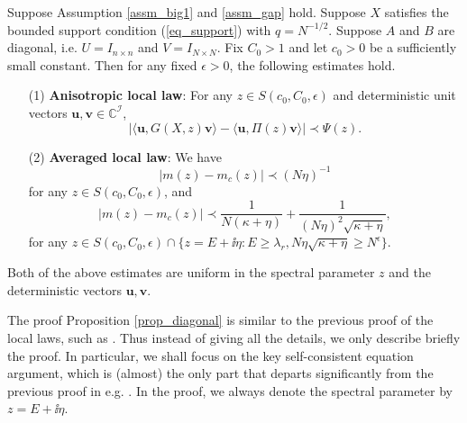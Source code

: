 \begin{proposition}\label{prop_diagonal}
Suppose Assumption \ref{assm_big1} and \eqref{assm_gap} hold. Suppose $X$ satisfies the bounded support condition (\ref{eq_support}) with $q= N^{-1/2}$. Suppose $A$ and $B$ are diagonal, i.e. $U=I_{n\times n}$ and $V=I_{N\times N}$. Fix $C_0>1$ and let $c_0>0$ be a sufficiently small constant. Then for any fixed $\epsilon>0$, the following estimates hold. %
\begin{itemize}
\item[(1)] {\bf Anisotropic local law}:  For any $z\in S(c_0,C_0,\epsilon)$ and deterministic unit vectors $\mathbf u, \mathbf v \in \mathbb C^{\mathcal I}$,
\begin{equation}\label{aniso_diagonal}
\left| \langle \mathbf u, G(X,z) \mathbf v\rangle - \langle \mathbf u, \Pi (z)\mathbf v\rangle \right| \prec \Psi(z).
\end{equation}

\item[(2)] {\bf Averaged local law}: We have %
\begin{equation}\label{aver_diagonal}
 | m(z)-m_{c}(z)|\prec ({N\eta})^{-1}
\end{equation}
for any $z\in S(c_0,C_0,\epsilon)$, and 
\begin{equation}\label{aver_out}
 | m(z)-m_{c}(z)|\prec \frac{1}{N(\kappa +\eta)} + \frac{1}{(N\eta)^2\sqrt{\kappa +\eta}},
\end{equation}
for any $z\in S(c_0,C_0,\epsilon)\cap \{z=E+\ii\eta: E\ge \lambda_r, N\eta\sqrt{\kappa + \eta} \ge N^\epsilon\}$. 
\end{itemize}
Both of the above estimates are uniform in the spectral parameter $z$ and the deterministic vectors $\mathbf u, \mathbf v$.

\end{proposition}
The proof Proposition \ref{prop_diagonal} is similar to the previous proof of the local laws, such as \cite{isotropic, DY, Anisotropic, XYY_circular}. Thus instead of giving all the details, we only describe briefly the proof. In particular, we shall focus on the key self-consistent equation argument, which is (almost) the only part that departs significantly from the previous proof in e.g. \cite{isotropic}. In the proof, we always denote the spectral parameter by $z=E+\ii\eta$. 

